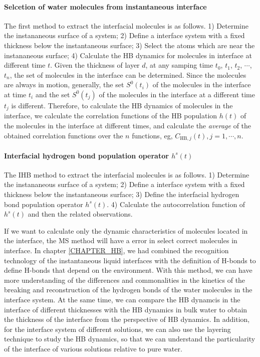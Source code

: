 {\paragraph{Selcetion of water molecules from instantaneous interface}
The first method to extract the interfacial molecules is as follows. 
1) Determine the instananeous surface of a system;
2) Define a interface system with a fixed thickness below the instantaneous surface; 
3) Select the atoms which are near the instananeous surface;
4) Calculate the HB dynamics for molecules in interface at different time $t$.
Given the thickness of layer $d$, at any samping time $t_0$, $t_1$, $t_2$, $\cdots$, $t_n$, the set of molecules in the interface can be determined. 
Since the molecules are always in motion, generally, the set $S^0(t_i)$ of the molecules in the interface at time $t_i$ 
and the set $S^0(t_j)$ of the molecules in the interface at a different time $t_j$ is different. 
Therefore, to calculate the HB dynamics of molecules in the interface, we calculate the correlation functions of 
the HB population $h(t)$ of the molecules in the interface at different times, 
and calculate the \emph{average} of the obtained correlation functions 
over the $n$ functions, eg, $C_{\text{HB},j}(t), j=1,\cdots,n$.
 
\paragraph{Interfacial hydrogen bond population operator $h^s(t)$}
The IHB method to extract the interfacial molecules is as follows. 
1) Determine the instananeous surface of a system;
2) Define a interface system with a fixed thickness below the instantaneous surface; 
3) Define the interfacial hydrogen bond population operator $h^s(t)$.
4) Calculate the autocorrelation function of $h^s(t)$ and then the related observations. 

If we want to calculate only the dynamic characteristics of molecules located in the interface, 
the MS method will have a error in select correct molecules in interface. 
In chapter \ref{CHAPTER_HB}, we had combined the recognition technology of the instantaneous liquid interfaces \cite{Willard2010} 
with the definition of H-bonds \cite{AL96b,Luzar1996} to define H-bonds that depend on the environment. 
With this method, we can have more understanding of the differences and commonalities in the kinetics of the breaking and reconstruction of the hydrogen bonds 
of the water molecules in the interface system. At the same time, we can compare the HB dynamcis in the interface of different thicknesses 
with the HB dynamics in bulk water to obtain the thickness of the interface from the perspective of HB dynamics. 
In addition, for the interface system of different solutions, we can also use the layering technique to study the HB dynamics,
so that we can understand the particularity of the interface of various solutions relative to pure water. 

}
